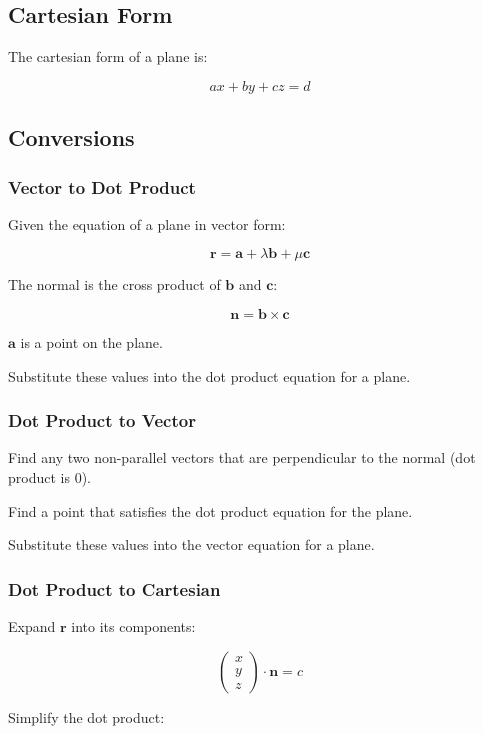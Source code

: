 \documentclass[a4paper,11pt]{report}
\newcommand{\bb}{\boldsymbol}
\begin{document}
\subsection{Cartesian Form}

The cartesian form of a plane is:

$$
ax + by + cz = d
$$

\subsection{Conversions}

\subsubsection{Vector to Dot Product}

Given the equation of a plane in vector form:

$$
\bb{r} = \bb{a} + \lambda \bb{b} + \mu \bb{c}
$$

The normal is the cross product of $\bb{b}$ and $\bb{c}$:

$$
\bb{n} = \bb{b} \times \bb{c}
$$

$\bb{a}$ is a point on the plane.

Substitute these values into the dot product equation for a plane.

\subsubsection{Dot Product to Vector}

Find any two non-parallel vectors that are perpendicular to the normal (dot
product is 0).

Find a point that satisfies the dot product equation for the plane.

Substitute these values into the vector equation for a plane.

\subsubsection{Dot Product to Cartesian}

Expand $\bb{r}$ into its components:

$$
\begin{pmatrix} x \\ y \\ z \end{pmatrix} \cdot \bb{n} = c
$$

Simplify the dot product:
\end{document}
